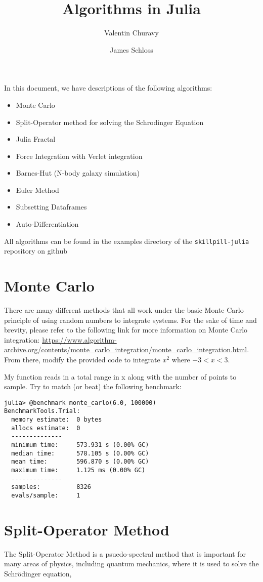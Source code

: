 \documentclass[11pt]{article}
\title{\textbf{Algorithms in Julia}}
\author{Valentin Churavy \and James Schloss}
\date{}
\begin{document}
\maketitle
In this document, we have descriptions of the following algorithms:
\begin{itemize}
\item Monte Carlo
\item Split-Operator method for solving the Schrodinger Equation
\item Julia Fractal
\item Force Integration with Verlet integration
\item Barnes-Hut (N-body galaxy simulation)
\item Euler Method
\item Subsetting Dataframes
\item Auto-Differentiation
\end{itemize}

All algorithms can be found in the examples directory of the \texttt{skillpill-julia} repository on github

\newpage
\section*{Monte Carlo}

There are many different methods that all work under the basic Monte Carlo principle of using random numbers to integrate systems.
For the sake of time and brevity, please refer to the following link for more information on Monte Carlo integration: \url{https://www.algorithm-archive.org/contents/monte_carlo_integration/monte_carlo_integration.html}. From there, modify the provided code to integrate $x^2$ where $-3 < x < 3$.

My function reads in a total range in x along with the number of points to sample. Try to match (or beat) the following benchmark:

\begin{lstlisting}
julia> @benchmark monte_carlo(6.0, 100000)
BenchmarkTools.Trial: 
  memory estimate:  0 bytes
  allocs estimate:  0
  --------------
  minimum time:     573.931 s (0.00% GC)
  median time:      578.105 s (0.00% GC)
  mean time:        596.870 s (0.00% GC)
  maximum time:     1.125 ms (0.00% GC)
  --------------
  samples:          8326
  evals/sample:     1

\end{lstlisting}


\newpage
\section*{Split-Operator Method}
The Split-Operator Method is a psuedo-spectral method that is important for many areas of physics, including quantum mechanics, where it is used to solve the Schr\"odinger equation,
\end{document}
